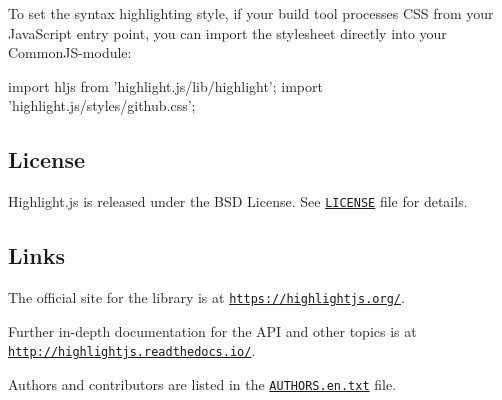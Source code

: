 To set the syntax highlighting style, if your build tool processes C\+SS from your Java\+Script entry point, you can import the stylesheet directly into your Common\+J\+S-\/module\+:


\begin{DoxyCode}
import hljs from 'highlight.js/lib/highlight';
import 'highlight.js/styles/github.css';
\end{DoxyCode}


\subsection*{License}

Highlight.\+js is released under the B\+SD License. See \href{https://github.com/highlightjs/highlight.js/blob/master/LICENSE}{\tt L\+I\+C\+E\+N\+SE} file for details.

\subsection*{Links}

The official site for the library is at \href{https://highlightjs.org/}{\tt https\+://highlightjs.\+org/}.

Further in-\/depth documentation for the A\+PI and other topics is at \href{http://highlightjs.readthedocs.io/}{\tt http\+://highlightjs.\+readthedocs.\+io/}.

Authors and contributors are listed in the \href{https://github.com/highlightjs/highlight.js/blob/master/AUTHORS.en.txt}{\tt A\+U\+T\+H\+O\+R\+S.\+en.\+txt} file. 